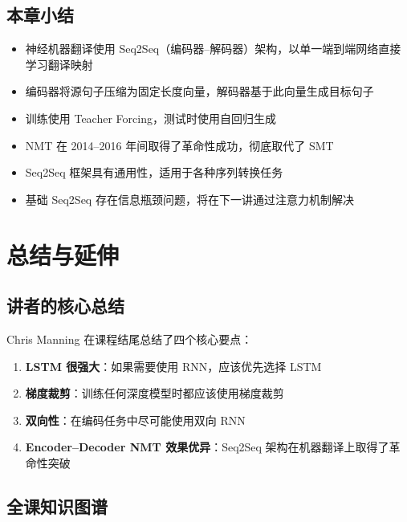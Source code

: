 \documentclass[a4paper]{article}
\begin{document}



\subsection{本章小结}

\begin{itemize}
    \item 神经机器翻译使用 Seq2Seq（编码器--解码器）架构，以单一端到端网络直接学习翻译映射
    \item 编码器将源句子压缩为固定长度向量，解码器基于此向量生成目标句子
    \item 训练使用 Teacher Forcing，测试时使用自回归生成
    \item NMT 在 2014--2016 年间取得了革命性成功，彻底取代了 SMT
    \item Seq2Seq 框架具有通用性，适用于各种序列转换任务
    \item 基础 Seq2Seq 存在信息瓶颈问题，将在下一讲通过注意力机制解决
\end{itemize}


\section{总结与延伸}

\subsection{讲者的核心总结}




Chris Manning 在课程结尾总结了四个核心要点：

\begin{enumerate}
    \item \textbf{LSTM 很强大}：如果需要使用 RNN，应该优先选择 LSTM
    \item \textbf{梯度裁剪}：训练任何深度模型时都应该使用梯度裁剪
    \item \textbf{双向性}：在编码任务中尽可能使用双向 RNN
    \item \textbf{Encoder--Decoder NMT 效果优异}：Seq2Seq 架构在机器翻译上取得了革命性突破
\end{enumerate}

\subsection{全课知识图谱}
\end{document}
